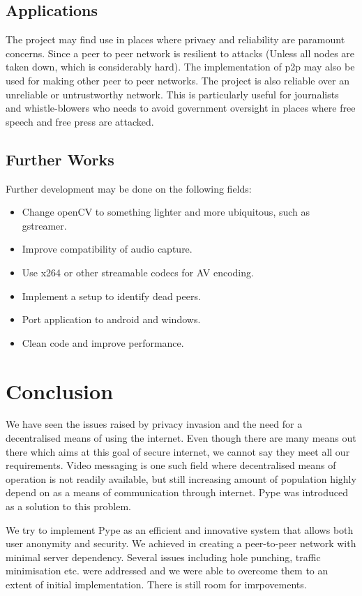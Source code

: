 \documentclass[a4paper,11pt]{article}
\begin{document}
\subsection{Applications}
The project may find use in places where privacy and reliability are paramount concerns. Since a peer to peer network is resilient to attacks (Unless all nodes are taken down, which is considerably hard). The implementation of p2p may also be used for making other peer to peer networks. The project is also reliable over an unreliable or untrustworthy network. This is particularly useful for journalists and whistle-blowers who needs to avoid government oversight in places where free speech and free press are attacked.
\subsection{Further Works}
Further development may be done on the following fields:
\begin{itemize}
\item Change openCV to something lighter and more ubiquitous, such as gstreamer.
\item Improve compatibility of audio capture.
\item Use x264 or other streamable codecs for AV encoding.
\item Implement a setup to identify dead peers.
\item Port application to android and windows.
\item Clean code and improve performance.
\end{itemize}
  
\section{Conclusion}
We have seen the issues raised by privacy invasion and the need for a decentralised means of using the internet. Even though there are many means out there which aims at this goal of secure internet, we cannot say they meet all our requirements. Video messaging is one such field where decentralised means of operation is not readily available, but still increasing amount of population highly depend on as a means of communication through internet. Pype was introduced as a solution to this problem.   

 We try to implement Pype as an efficient and innovative system that allows both user anonymity and security. We achieved in creating a peer-to-peer network with minimal server dependency. Several issues including hole punching, traffic minimisation etc. were addressed and we were able to overcome them to an extent of initial implementation. There is still room for imrpovements.
\end{document}
